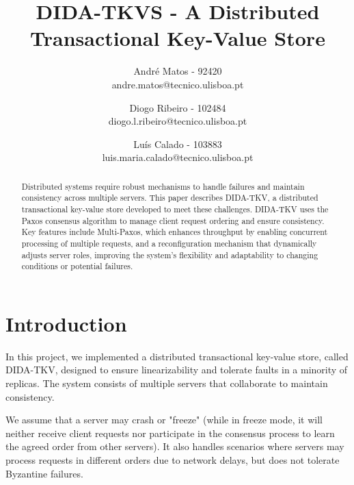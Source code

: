 \documentclass[times, 10pt,twocolumn]{article}
\begin{document}
\title{DIDA-TKVS - A Distributed Transactional Key-Value Store}

\author{
André Matos - 92420\\
andre.matos@tecnico.ulisboa.pt\\
\and
Diogo Ribeiro - 102484\\
diogo.l.ribeiro@tecnico.ulisboa.pt\\
\and
Luís Calado - 103883\\
luis.maria.calado@tecnico.ulisboa.pt\\
}

\maketitle
\thispagestyle{empty}

\begin{abstract}
   Distributed systems require robust mechanisms to handle failures and maintain consistency across multiple servers. This paper describes DIDA-TKV, a distributed transactional key-value store developed to meet these challenges. DIDA-TKV uses the Paxos consensus algorithm to manage client request ordering and ensure consistency. Key features include Multi-Paxos, which enhances throughput by enabling concurrent processing of multiple requests, and a reconfiguration mechanism that dynamically adjusts server roles, improving the system's flexibility and adaptability to changing conditions or potential failures.
\end{abstract}



\section{Introduction}

In this project, we implemented a distributed transactional key-value store, called DIDA-TKV, designed to ensure linearizability and tolerate faults in a minority of replicas. The system consists of multiple servers that collaborate to maintain consistency.

We assume that a server may crash or "freeze" (while in freeze mode, it will neither receive client requests nor participate in the consensus process to learn the agreed order from other servers). It also handles scenarios where servers may process requests in different orders due to network delays, but does not tolerate Byzantine failures.
\end{document}
